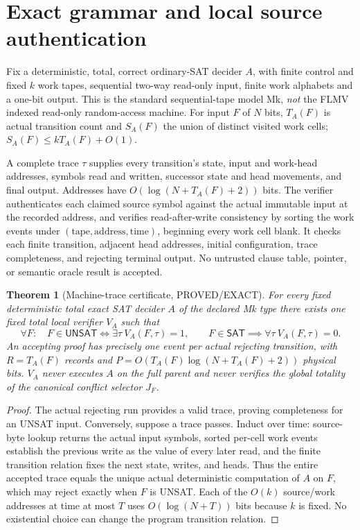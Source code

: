 \documentclass[11pt]{article}
\newtheorem{theorem}{Theorem}
\newcommand{\SAT}{\mathsf{SAT}}
\newcommand{\UNSAT}{\mathsf{UNSAT}}
\begin{document}
\section{Exact grammar and local source authentication}
Fix a deterministic, total, correct ordinary-SAT decider $A$, with finite
control and fixed $k$ work tapes, sequential two-way read-only input,
finite work alphabets and a one-bit output. This is the standard
sequential-tape model Mk, \emph{not} the FLMV indexed read-only
random-access machine. For input $F$ of $N$ bits, $T_A(F)$ is actual
transition count and $S_A(F)$ the union of distinct visited work cells;
$S_A(F)\le kT_A(F)+O(1)$.

A complete trace $\tau$ supplies every transition's state, input and
work-head addresses, symbols read and written, successor state and
head movements, and final output. Addresses have
$O(\log(N+T_A(F)+2))$ bits. The verifier authenticates each claimed source
symbol against the actual immutable input at the recorded address,
and verifies read-after-write consistency by sorting the work events
under $(\mathrm{tape},\mathrm{address},\mathrm{time})$, beginning every
work cell blank. It checks each finite transition, adjacent head
addresses, initial configuration, trace completeness, and rejecting
terminal output. No untrusted clause table, pointer, or semantic
oracle result is accepted.

\begin{theorem}[Machine-trace certificate, PROVED/EXACT]\label{th:trace}
For every fixed deterministic total exact SAT decider $A$ of the
declared Mk type there exists one fixed total local verifier $V_A$
such that
\[
\forall F:\quad F\in\UNSAT\iff\exists\tau\ V_A(F,\tau)=1,
\qquad
F\in\SAT\implies\forall\tau\ V_A(F,\tau)=0.
\]
An accepting proof has precisely one event per actual rejecting
transition, with $R=T_A(F)$ records and
$P=O(T_A(F)\log(N+T_A(F)+2))$ physical bits.
$V_A$ never executes $A$ on the full parent and never verifies the
global totality of the canonical conflict selector $J_F$.
\end{theorem}
\begin{proof}
The actual rejecting run provides a valid trace, proving completeness
for an UNSAT input. Conversely, suppose a trace passes. Induct over
time: source-byte lookup returns the actual input symbols, sorted
per-cell work events establish the previous write as the value of
every later read, and the finite transition relation fixes the next
state, writes, and heads. Thus the entire accepted trace equals the
unique actual deterministic computation of $A$ on $F$, which may
reject exactly when $F$ is UNSAT. Each of the $O(k)$ source/work
addresses at time at most $T$ uses $O(\log(N+T))$ bits because $k$
is fixed. No existential choice can change the program transition
relation.
\end{proof}
\end{document}
